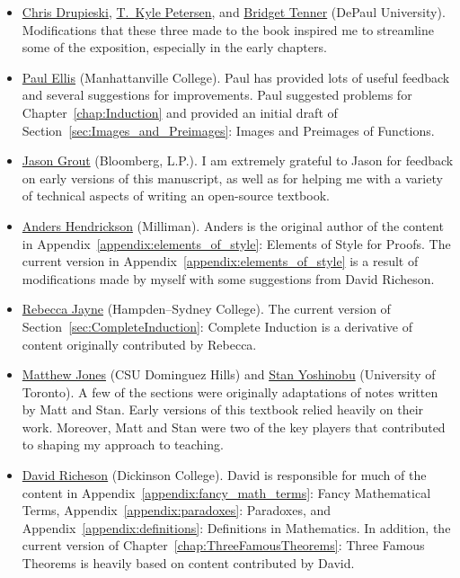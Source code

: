 \begin{itemize}
\item \href{https://math.depaul.edu/cdrupies/}{Chris Drupieski}, \href{http://math.depaul.edu/tpeter21/}{T.~Kyle Petersen}, and \href{http://math.depaul.edu/bridget/}{Bridget Tenner} (DePaul University). Modifications that these three made to the book inspired me to streamline some of the exposition, especially in the early chapters.
\item \href{http://www.paulellis.org}{Paul Ellis} (Manhattanville College). Paul has provided lots of useful feedback and several suggestions for improvements. Paul suggested problems for Chapter~\ref{chap:Induction} and provided an initial draft of Section~\ref{sec:Images_and_Preimages}: Images and Preimages of Functions.
\item \href{http://jasongrout.org}{Jason Grout} (Bloomberg, L.P.).  I am extremely grateful to Jason for feedback on early versions of this manuscript, as well as for helping me with a variety of technical aspects of writing an open-source textbook.
\item \href{https://www.linkedin.com/in/andershendrickson/}{Anders Hendrickson} (Milliman). Anders is the original author of the content in Appendix~\ref{appendix:elements_of_style}: Elements of Style for Proofs. The current version in Appendix~\ref{appendix:elements_of_style} is a result of modifications made by myself with some suggestions from David Richeson.
\item \href{http://www.hsc.edu/rebecca-jayne}{Rebecca Jayne} (Hampden--Sydney College). The current version of Section~\ref{sec:CompleteInduction}: Complete Induction is a derivative of content originally contributed by Rebecca.
\item \href{https://www.linkedin.com/in/matt-jones-a704aab/}{Matthew Jones} (CSU Dominguez Hills) and \href{https://www.math.toronto.edu/cms/people/faculty/yoshinobu-stan/}{Stan Yoshinobu} (University of Toronto). A few of the sections were originally adaptations of notes written by Matt and Stan. Early versions of this textbook relied heavily on their work. Moreover, Matt and Stan were two of the key players that contributed to shaping my approach to teaching.
\item \href{https://divisbyzero.com}{David Richeson} (Dickinson College). David is responsible for much of the content in Appendix~\ref{appendix:fancy_math_terms}: Fancy Mathematical Terms, Appendix~\ref{appendix:paradoxes}: Paradoxes, and Appendix~\ref{appendix:definitions}: Definitions in Mathematics. In addition, the current version of Chapter~\ref{chap:ThreeFamousTheorems}: Three Famous Theorems is heavily based on content contributed by David.

\end{itemize}
